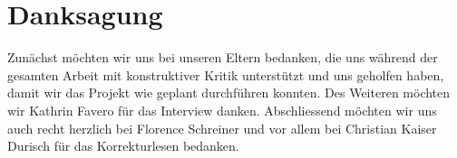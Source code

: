 
\chapter*{Danksagung}
Zunächst möchten wir uns bei unseren Eltern bedanken, die uns während der gesamten Arbeit mit konstruktiver Kritik unterstützt und uns geholfen haben, damit wir das Projekt wie geplant durchführen konnten. Des Weiteren möchten wir Kathrin Favero für das Interview danken.
\newline
Abschliessend möchten wir uns auch recht herzlich bei Florence Schreiner und vor allem bei Christian Kaiser Durisch für das Korrekturlesen bedanken.
\pagebreak